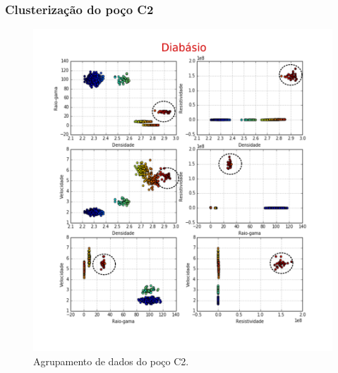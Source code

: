 \documentclass[aspectratio=10]{beamer} %
\begin{document}
\begin{frame}
\frametitle{Clusterização do poço C2}
\begin{figure}[H]
\centering
\includegraphics[scale=0.4]{Imagens/diabasioC2.png}
\caption{Agrupamento de dados do poço C2.}
\end{figure} 
\end{frame}
\end{document}
